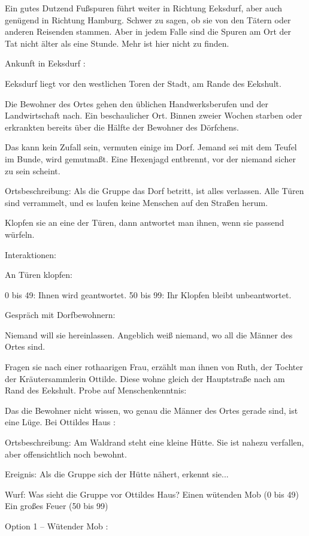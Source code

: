 Ein gutes Dutzend Fußspuren führt weiter in Richtung Eeksdurf, aber auch genügend in Richtung Hamburg. Schwer zu sagen, ob sie von den Tätern oder anderen Reisenden stammen. Aber in jedem Falle sind die Spuren am Ort der Tat nicht älter als eine Stunde. Mehr ist hier nicht zu finden.

Ankunft in Eeksdurf
:

Eeksdurf liegt vor den westlichen Toren der Stadt, am Rande des Eekshult.

Die Bewohner des Ortes gehen den üblichen Handwerksberufen und der Landwirtschaft nach. Ein beschaulicher Ort. Binnen zweier Wochen starben oder erkrankten bereits über die Hälfte der Bewohner des Dörfchens.

Das kann kein Zufall sein, vermuten einige im Dorf. Jemand sei mit dem Teufel im Bunde, wird gemutmaßt. Eine Hexenjagd entbrennt, vor der niemand sicher zu sein scheint.

Ortsbeschreibung: Als die Gruppe das Dorf betritt, ist alles verlassen. Alle Türen sind verrammelt, und es laufen keine Menschen auf den Straßen herum.

Klopfen sie an eine der Türen, dann antwortet man ihnen, wenn sie passend würfeln.

Interaktionen:

An Türen klopfen:

0 bis 49: Ihnen wird geantwortet.
50 bis 99: Ihr Klopfen bleibt unbeantwortet.

Gespräch mit Dorfbewohnern:

Niemand will sie hereinlassen.
Angeblich weiß niemand, wo all die Männer des Ortes sind.

Fragen sie nach einer rothaarigen Frau, erzählt man ihnen von Ruth, der Tochter der Kräutersammlerin Ottilde.
Diese wohne gleich der Hauptstraße nach am Rand des Eekshult.
Probe auf Menschenkenntnis:

Das die Bewohner nicht wissen, wo genau die Männer des Ortes gerade sind, ist eine Lüge.
Bei Ottildes Haus
:

Ortsbeschreibung: Am Waldrand steht eine kleine Hütte. Sie ist nahezu verfallen, aber offensichtlich noch bewohnt.

Ereignis: Als die Gruppe sich der Hütte nähert, erkennt sie...

Wurf: Was sieht die Gruppe vor Ottildes Haus?
Einen wütenden Mob (0 bis 49)
Ein großes Feuer (50 bis 99)

Option 1 – Wütender Mob
:


